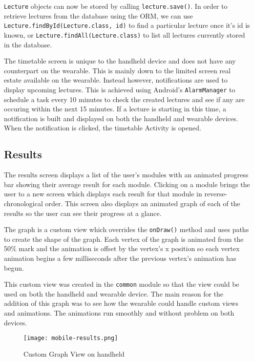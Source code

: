 \texttt{Lecture} objects can now be stored by calling \texttt{lecture.save()}.
In order to retrieve lectures from the database using the ORM, we can use
\texttt{Lecture.findById(Lecture.class, id)} to find a particular lecture once
it's id is known, or \texttt{Lecture.findAll(Lecture.class)} to list all
lectures currently stored in the database.

The timetable screen is unique to the handheld device and does not have any
counterpart on the wearable. This is mainly down to the limited screen
real estate available on the wearable. Instead however, notifications are used
to display upcoming lectures. This is achieved using Android's
\texttt{AlarmManager} to schedule a task every 10 minutes to check the created
lectures and see if any are occuring within the next 15 minutes. If a lecture
is starting in this time, a notification is built and displayed on both the
handheld and wearable devices. When the notification is clicked, the timetable
Activity is opened.

\subsection{Results}
The results screen displays a list of the user's modules with an animated
progress bar showing their average result for each module. Clicking on a module
brings the user to a new screen which displays each result for that module in
reverse-chronological order. This screen also displays an animated graph of
each of the results so the user can see their progress at a glance.

The graph is a custom view which overrides the \texttt{onDraw()} method and uses
paths to create the shape of the graph. Each vertex of the graph is animated
from the 50\% mark and the animation is offset by the vertex's x position so
each vertex animation begins a few milliseconds after the previous vertex's
animation has begun.

This custom view was created in the \texttt{common} module so that the view
could be used on both the handheld and wearable device. The main reason for
the addition of this graph was to see how the wearable could handle custom views
and animations. The animations run smoothly and without problem on both devices.


\begin{figure}
    \centering
    \texttt{[image: mobile-results.png]}
    \caption{Custom Graph View on handheld}
    \label{fig:mobile_results}
\end{figure}

